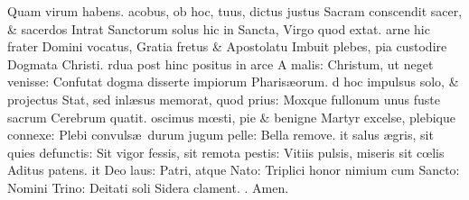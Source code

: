\documentclass[letter,11pt]{book}
\makeatletter
\DeclareRobustCommand{\Rbar}{\vers@resp{0pt}{R}}
\newcommand{\vers@resp@sym}{\raisebox{0.2ex}{\rotatebox[origin=c]{-20}{$\m@th\rceil$}}}
\newcommand{\vers@resp}[2]{%
  {\ooalign{\hidewidth\kern#1\vers@resp@sym\hidewidth\cr#2\cr}}%
}%
\def\R{\color{Red} \Rbar . \color{black}}
\makeatother
\begin{document}
\begin{multicols*}{2}
\newline \indent \indent Quam virum habens.
acobus, ob hoc, tuus, dictus justus
\newline \indent Sacram conscendit sacer, \& sacerdos
\newline \indent Intrat Sanctorum solus hic in Sancta,
\newline \indent \indent Virgo quod extat.
arne hic frater Domini vocatus,
\newline \indent Gratia fretus \& Apostolatu
\newline \indent Imbuit plebes, pia custodire
\newline \indent \indent Dogmata Christi.
rdua post hinc positus in arce
\newline \indent A malis: Christum, ut neget venisse:
\newline \indent Confutat dogma disserte impiorum
\newline \indent \indent Pharis\ae orum.
d hoc impulsus solo, \& projectus
\newline \indent Stat, sed inl\ae sus memorat, quod prius:
\newline \indent Moxque fullonum unus fuste sacrum
\newline \indent \indent Cerebrum quatit.
oscimus m\oe sti, pie \& benigne
\newline \indent Martyr excelse, plebique connexe:
\newline \indent Plebi convuls\ae \ durum jugum pelle:
\newline \indent \indent Bella remove.
it salus \ae gris, sit quies defunctis:
\newline \indent Sit vigor fessis, sit remota pestis:
\newline \indent Vitiis pulsis, miseris sit c\oe lis
\newline \indent \indent Aditus patens.
it Deo laus: Patri, atque Nato:
\newline \indent Triplici honor nimium cum Sancto:
\newline \indent Nomini Trino: Deitati soli
\newline \indent \indent Sidera clament. \R Amen.

\end{multicols*}
\end{document}

